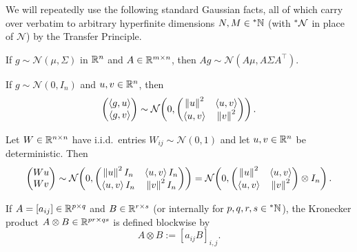 We will repeatedly use the following standard Gaussian facts, all of which carry over verbatim to arbitrary hyperfinite dimensions $N, M \in {}^*\mathbb{N}$ (with ${}^*\mathcal{N}$ in place of $\mathcal{N}$) by the Transfer Principle.

\begin{proposition}\label{prop:ch2-gauss-linear}
If $g \sim \mathcal{N}(\mu, \Sigma)$ in $\mathbb{R}^n$ and $A \in \mathbb{R}^{m \times n}$, then $Ag \sim \mathcal{N}(A\mu, A\Sigma A^\top)$.
\end{proposition}

\begin{proposition}\label{prop:ch2-gauss-ip}
If $g \sim \mathcal{N}(0, I_n)$ and $u, v \in \mathbb{R}^n$, then
\begin{equation}\label{eq:ch2-gauss-ip}
\begin{pmatrix} \left\langle g, u \right\rangle \\ \left\langle g, v \right\rangle \end{pmatrix}
\sim \mathcal{N}\!\left(0, \begin{pmatrix} \left\lVert u \right\rVert^2 & \left\langle u, v \right\rangle \\ \left\langle u, v \right\rangle & \left\lVert v \right\rVert^2 \end{pmatrix}\right).
\end{equation}
\end{proposition}

\begin{proposition}\label{prop:ch2-gauss-matvec}
Let $W \in \mathbb{R}^{n \times n}$ have i.i.d.\ entries $W_{ij} \sim \mathcal{N}(0, 1)$ and let $u, v \in \mathbb{R}^n$ be deterministic. Then
\begin{equation}\label{eq:ch2-gauss-matvec}
\begin{pmatrix} Wu \\ Wv \end{pmatrix}
\sim \mathcal{N}\!\left(0, \begin{pmatrix} \left\lVert u \right\rVert^2 I_n & \left\langle u, v \right\rangle I_n \\ \left\langle u, v \right\rangle I_n & \left\lVert v \right\rVert^2 I_n \end{pmatrix}\right)
= \mathcal{N}\!\left(0, \begin{pmatrix} \left\lVert u \right\rVert^2 & \left\langle u, v \right\rangle \\ \left\langle u, v \right\rangle & \left\lVert v \right\rVert^2 \end{pmatrix} \otimes I_n\right).
\end{equation}
\end{proposition}

\begin{definition}\label{def:ch2-kronecker}
If $A = [a_{ij}] \in \mathbb{R}^{p \times q}$ and $B \in \mathbb{R}^{r \times s}$ (or internally for $p, q, r, s \in {}^*\mathbb{N}$), the Kronecker product $A \otimes B \in \mathbb{R}^{pr \times qs}$ is defined blockwise by
\begin{equation}\label{eq:ch2-kronecker}
A \otimes B := [a_{ij} B]_{i,j}.
\end{equation}
\end{definition}

